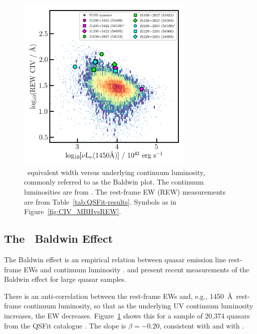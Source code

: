 \documentclass[fleqn,usenatbib]{mnras}
\begin{document}
\begin{figure}
  \centering
  \includegraphics[width=8.5cm, trim=0.2cm 0.2cm 0.0cm 0.2cm, clip]{figures/CIV_CLQs_Baldwin_20200519.png}
   \vspace{-12pt}
   \caption[]{\civ\ equivalent width versus underlying continuum luminosity,
     commonly referred to as the Baldwin plot.  The continuum luminosities
     are from \citet{Calderone2017}.  The rest-frame EW (REW) measurements
     are from Table~\ref{tab:QSFit-results}.  Symbols as in
     Figure~\ref{fig:CIV_MBHvsREW}.
   }
  \label{fig:CIV_Baldwin}
\end{figure}

\subsection{The \civ\ Baldwin Effect}
The Baldwin effect \citep{Baldwin1977} is an empirical relation
between quasar emission line rest-frame EWs and continuum luminosity
\citep[e.g.,][]{Shields2007, Hamann2017, Calderone2017}.
\citet{Hamann2017} and \citet{Calderone2017} present recent
measurements of the Baldwin effect for large quasar samples.

There is an anti-correlation between the rest-frame EWs and, e.g.,
1450~\AA\ rest-frame continuum luminosity, so that as the underlying
UV continuum luminosity increases, the EW decreases.
Figure~\ref{fig:CIV_Baldwin} shows this for a sample of 20,374 quasars
from the QSFit catalogue \citep{Calderone2017}.  The slope is $\beta=
-0.20$, consistent with \citet[][ $\beta=-0.25$, but for bolometric
luminosity rather than rest-frame UV continuum luminosity]
{Kozlowski2017} and with \citet[][ $\beta=-0.23$]{Hamann2017}.
\end{document}
